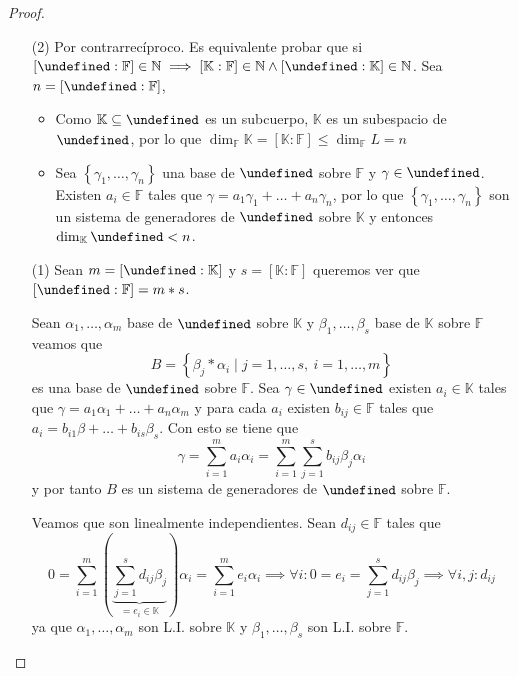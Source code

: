 \documentclass[10pt, spanish]{report}
\theoremstyle{definition}
\newcommand{\N}{\mathbb{N}}
\newcommand{\F}{\mathbb{F}}
\newcommand{\K}{\mathbb{K}}
\let\L\undefined
\newcommand{\L}{\mathbb{L}}
\renewcommand{\leq}{\leqslant}
\begin{document}
\begin{proof}\hspace{0pt}
    \begin{enumerate}
        \item[(2)] Por contrarrecíproco. Es equivalente probar que si
            $[\L:\F]\in \N\implies[\K:\F]\in \N \wedge[\L:\K]\in \N$. Sea
            $n=[\L:\F]$,
            \begin{itemize}
                \item Como $\K\subseteq\L$ es un subcuerpo, $\K$ es un
                    subespacio de $\L$, por lo que $\dim_\F{\K}=[\K:\F]\leq
                    \dim_\F{L}=n$
                \item Sea $\left\{ \gamma_1,\ldots,\gamma_n \right\}$ una base
                    de $\L$ sobre $\F$ y $\gamma\in \L$. Existen $a_i\in\F$ tales
                    que $\gamma=a_1\gamma_1+\ldots+a_n\gamma_n$, por lo que
                    $\left\{ \gamma_1,\ldots,\gamma_n \right\} $ son un sistema
                    de generadores de $\L$ sobre $\K$ y entonces
                    $\dim_\K{\L}<n$.
            \end{itemize}
        \item[(1)] Sean $m=[\L:\K]$ y $s=[\K:\F]$ queremos ver que
            $[\L:\F]=m*s$.

            Sean $\alpha_1,\ldots,\alpha_m$ base de $\L$ sobre
            $\K$ y $\beta_1,\ldots,\beta_s$ base de $\K$ sobre $\F$ veamos que
            \[B=\left\{\beta_j*\alpha_i\mid j=1,\ldots,s,\ i=1,\ldots,m\right\}\]
            es una base de $\L$ sobre $\F$. Sea $\gamma\in\L$ existen $a_i\in\K$
            tales que $\gamma=a_1\alpha_1+\ldots+a_n\alpha_m$ y para cada $a_i$
            existen $b_{ij}\in\F$ tales que $a_i=b_{i1}\beta+\ldots+b_{is}
            \beta_s$. Con esto se tiene que \[\gamma=\sum_{i=1}^{m}a_i\alpha_i=
            \sum_{i=1}^m\sum_{j=1}^sb_{ij}\beta_j\alpha_i\] y por tanto $B$ es
            un sistema de generadores de $\L$ sobre $\F$.

            Veamos que son linealmente independientes. Sean $d_{ij}\in\F$ tales
            que
            \[0=\sum_{i=1}^m(\underbrace{\sum_{j=1}^sd_{ij}\beta_j}_{=e_i\in\K})
            \alpha_i=\sum_{i=1}^me_i\alpha_i\implies\forall i: 0=e_i=\sum_{j=1}^sd_{ij}
            \beta_j\implies\forall i,j: d_{ij}\]
            ya que $\alpha_1,\ldots,\alpha_m$ son L.I. sobre $\K$ y
            $\beta_1,\ldots,\beta_s$ son L.I. sobre $\F$.
    \end{enumerate}
    \vspace{-1.75em}
\end{proof}
\end{document}

